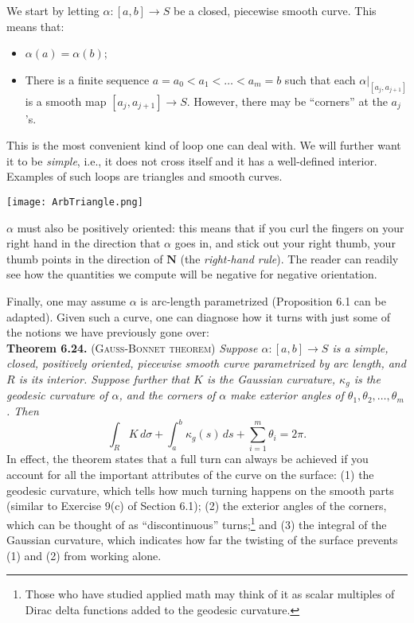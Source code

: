 \documentclass[leqno]{book}
\begin{document}
We start by letting $\alpha:[a,b]\to S$ be a closed, piecewise smooth curve.  This means that:
\begin{itemize}
\item $\alpha(a)=\alpha(b)$;

\item There is a finite sequence $a=a_0<a_1<\dots<a_m=b$ such that each $\alpha|_{[a_j,a_{j+1}]}$ is a smooth map $[a_j,a_{j+1}]\to S$.  However, there may be ``corners'' at the $a_j$'s.
\end{itemize}
This is the most convenient kind of loop one can deal with.  We will further want it to be \emph{simple}, i.e., it does not cross itself and it has a well-defined interior.  Examples of such loops are triangles and smooth curves.
\begin{center}
\texttt{[image: ArbTriangle.png]}
\end{center}
$\alpha$ must also be positively oriented: this means that if you curl the fingers on your right hand in the direction that $\alpha$ goes in, and stick out your right thumb, your thumb points in the direction of $\mathbf N$ (the \emph{right-hand rule}).  The reader can readily see how the quantities we compute will be negative for negative orientation.

Finally, one may assume $\alpha$ is arc-length parametrized (Proposition 6.1 can be adapted).  Given such a curve, one can diagnose how it turns with just some of the notions we have previously gone over:\\

\noindent\textbf{Theorem 6.24.} \textsc{(Gauss-Bonnet theorem)} \emph{Suppose $\alpha:[a,b]\to S$ is a simple, closed, positively oriented, piecewise smooth curve parametrized by arc length, and $R$ is its interior.  Suppose further that $K$ is the Gaussian curvature, $\kappa_g$ is the geodesic curvature of $\alpha$, and the corners of $\alpha$ make exterior angles of $\theta_1,\theta_2,\dots,\theta_m$.  Then}
$$\int_R K\,d\sigma+\int_a^b\kappa_g(s)\,ds+\sum_{i=1}^m\theta_i=2\pi.$$
In effect, the theorem states that a full turn can always be achieved if you account for all the important attributes of the curve on the surface: (1) the geodesic curvature, which tells how much turning happens on the smooth parts (similar to Exercise 9(c) of Section 6.1); (2) the exterior angles of the corners, which can be thought of as ``discontinuous'' turns;\footnote{Those who have studied applied math may think of it as scalar multiples of Dirac delta functions added to the geodesic curvature.} and (3) the integral of the Gaussian curvature, which indicates how far the twisting of the surface prevents (1) and (2) from working alone.\\
\end{document}
